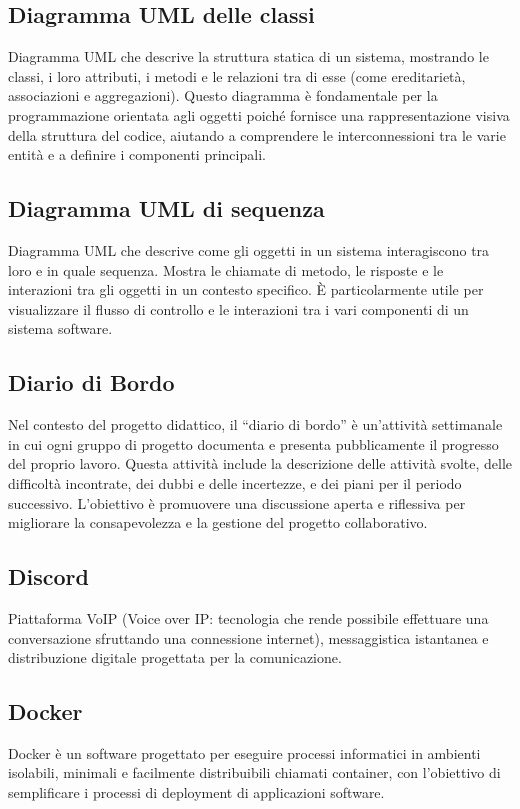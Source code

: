 \subsection*{Diagramma UML delle classi}
Diagramma UML che descrive la struttura statica di un sistema, mostrando le classi, i loro attributi, i metodi e le relazioni tra di esse (come ereditarietà, 
associazioni e aggregazioni). Questo diagramma è fondamentale per la programmazione orientata agli oggetti poiché fornisce una rappresentazione visiva della 
struttura del codice, aiutando a comprendere le interconnessioni tra le varie entità e a definire i componenti principali.

\hypertarget{sec:diagramma_uml_sequenza}{}
\subsection*{Diagramma UML di sequenza}
Diagramma UML che descrive come gli oggetti in un sistema interagiscono tra loro e in quale sequenza. Mostra le chiamate di metodo, le risposte e le interazioni
tra gli oggetti in un contesto specifico. È particolarmente utile per visualizzare il flusso di controllo e le interazioni tra i vari componenti di un sistema
software.

\hypertarget{sec:diario_di_bordo}{}
\subsection*{Diario di Bordo}
Nel contesto del progetto didattico, il “diario di bordo” è un’attività settimanale in cui ogni gruppo di progetto documenta e presenta pubblicamente il progresso del proprio lavoro. 
Questa attività include la descrizione delle attività svolte, delle difficoltà incontrate, dei dubbi e delle incertezze, e dei piani per il periodo successivo. 
L’obiettivo è promuovere una discussione aperta e riflessiva per migliorare la consapevolezza e la gestione del progetto collaborativo.

\subsection*{Discord}
Piattaforma VoIP (Voice over IP: tecnologia che rende possibile effettuare una conversazione sfruttando una connessione internet), messaggistica istantanea 
e distribuzione digitale progettata per la comunicazione.

\hypertarget{sec:docker}{}
\subsection*{Docker}
Docker è un software progettato per eseguire processi informatici in ambienti isolabili, minimali e facilmente distribuibili chiamati 
container, con l’obiettivo di semplificare i processi di deployment di applicazioni software.

